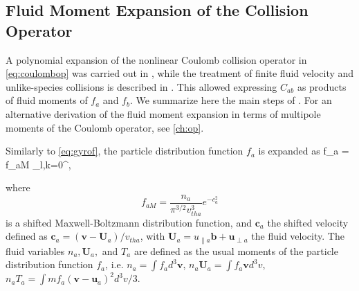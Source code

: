 {{\subsection{Fluid Moment Expansion of the Collision Operator}
\label{section:jifluidexpansion}

A polynomial expansion of the nonlinear Coulomb collision operator in \cref{eq:coulombop} was carried out in \citet{Ji2009}, while the treatment of finite fluid velocity and unlike-species collisions is described in \citet{Ji2008}.
%
This allowed expressing $C_{ab}$ as products of fluid moments of $f_a$ and $f_b$. 
%
We summarize here the main steps of \citet{Ji2006, Ji2008}.
%
For an alternative derivation of the fluid moment expansion in terms of multipole moments of the Coulomb operator, see \cref{ch:op}.

Similarly to \cref{eq:gyrof}, the particle distribution function $f_a$ is expanded as
%
\be
    f_a = f_{aM} \sum_{l,k=0}^{\infty},
    \label{eq:faji}
\ee

\noindent where  
%
\begin{equation}
    f_{aM}=\frac{n_a}{\pi^{3/2} v_{tha}^3} e^{-c_a^2}
\end{equation}
%
is a shifted Maxwell-Boltzmann distribution function, and $\mathbf c_a$ the shifted velocity defined as $\mathbf c_a=(\mathbf v - \mathbf U_a)/v_{tha}$, with $\mathbf U_a=u_{\parallel a}\mathbf b+\mathbf u_{\perp a}$ the fluid velocity. The fluid variables $n_a, \mathbf U_a,$ and $T_a$ are defined as the usual moments of the particle distribution function $f_a$, i.e. $n_a = \int f_a d^3 \mathbf v$, $n_a \mathbf U_a = \int f_a \mathbf v d^3v$, $n_a T_a = \int m f_a (\mathbf v - \mathbf u_a)^2 d^3v/3$.

}}
